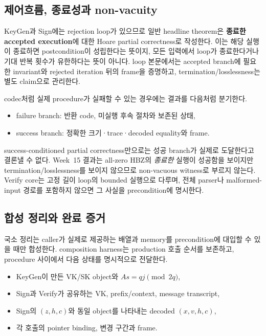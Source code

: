 \subsection{제어흐름, 종료성과 non-vacuity}

KeyGen과 Sign에는 rejection loop가 있으므로 일반 headline theorem은
\textbf{종료한 accepted execution}에 대한 Hoare partial correctness로 작성한다.
이는 해당 실행이 종료하면 postcondition이 성립한다는 뜻이지, 모든 입력에서
loop가 종료한다거나 기대 반복 횟수가 유한하다는 뜻이 아니다. loop 본문에서는
accepted branch에 필요한 invariant와 rejected iteration 뒤의 frame을 증명하고,
termination/losslessness는 별도 claim으로 관리한다.

codec처럼 실제 procedure가 실패할 수 있는 경우에는 결과를 다음처럼 분기한다.

\begin{itemize}
  \item failure branch: 반환 code, 미실행 후속 절차와 보존된 상태,
  \item success branch: 정확한 크기·trace·decoded equality와 frame.
\end{itemize}

success-conditioned partial correctness만으로는 성공 branch가 실제로 도달한다고
결론낼 수 없다. Week~15 결과는 all-zero HBZ의 \emph{종료한} 실행이 성공함을
보이지만 termination/losslessness를 보이지 않으므로 non-vacuous witness로
부르지 않는다. Verify core는 고정 길이 loop의 bounded 실행으로 다루며, 전체
parser나 malformed-input 경로를 포함하지 않으면 그 사실을 precondition에
명시한다.

\subsection{합성 정리와 완료 증거}

국소 정리는 caller가 실제로 제공하는 배열과 memory를 precondition에 대입할 수
있을 때만 합성한다. composition harness는 production 호출 순서를 보존하고,
procedure 사이에서 다음 상태를 명시적으로 전달한다.

\begin{itemize}
  \item KeyGen이 만든 VK/SK object와 \(As=qj\pmod{2q}\),
  \item Sign과 Verify가 공유하는 VK, prefix/context, message transcript,
  \item Sign의 \((z,h,c)\)와 동일 object를 나타내는 decoded \((x,v,h,c)\),
  \item 각 호출의 pointer binding, 변경 구간과 frame.
\end{itemize}

